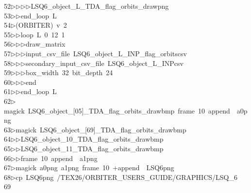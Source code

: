 \begin{tabbing}
52\>$\triangleright$\>$\triangleright$\>$\triangleright$\>$\triangleright$\>LSQ6\_object\_L\_TDA\_flag\_orbits\_drawpng\ \\[0pt]
53\>$\triangleright$\>$\triangleright$\>end\_loop\ L\\[0pt]
54\>$\triangleright$\>(ORBITER)\ v\ 2\ \\[0pt]
55\>$\triangleright$\>$\triangleright$\>loop\ L\ 0\ 12\ 1\ \\[0pt]
56\>$\triangleright$\>$\triangleright$\>$\triangleright$\>draw\_matrix\ \\[0pt]
57\>$\triangleright$\>$\triangleright$\>$\triangleright$\>input\_csv\_file\ LSQ6\_object\_L\_INP\_flag\_orbitscsv\ \\[0pt]
58\>$\triangleright$\>$\triangleright$\>$\triangleright$\>secondary\_input\_csv\_file\ LSQ6\_object\_L\_INPcsv\ \\[0pt]
59\>$\triangleright$\>$\triangleright$\>$\triangleright$\>box\_width\ 32\ bit\_depth\ 24\ \\[0pt]
60\>$\triangleright$\>$\triangleright$\>$\triangleright$\>end\ \\[0pt]
61\>$\triangleright$\>$\triangleright$\>end\_loop\ L\\[0pt]
62\>$\triangleright$\>magick\ LSQ6\_object\_[05]\_TDA\_flag\_orbits\_drawbmp\ frame\ 10\ append\ \ a0png\\[0pt]
63\>$\triangleright$\>magick\ LSQ6\_object\_[69]\_TDA\_flag\_orbits\_drawbmp\ \\[0pt]
64\>$\triangleright$\>$\triangleright$\>LSQ6\_object\_10\_TDA\_flag\_orbits\_drawbmp\ \\[0pt]
65\>$\triangleright$\>$\triangleright$\>LSQ6\_object\_11\_TDA\_flag\_orbits\_drawbmp\ \\[0pt]
66\>$\triangleright$\>$\triangleright$\>frame\ 10\ append\ \ a1png\\[0pt]
67\>$\triangleright$\>magick\ a0png\ a1png\ frame\ 10\ +append\ \ LSQ6png\\[0pt]
68\>$\triangleright$\>cp\ LSQ6png\ /TEX26/ORBITER\_USERS\_GUIDE/GRAPHICS/LSQ\_6\\[0pt]
69\>\end{tabbing}
